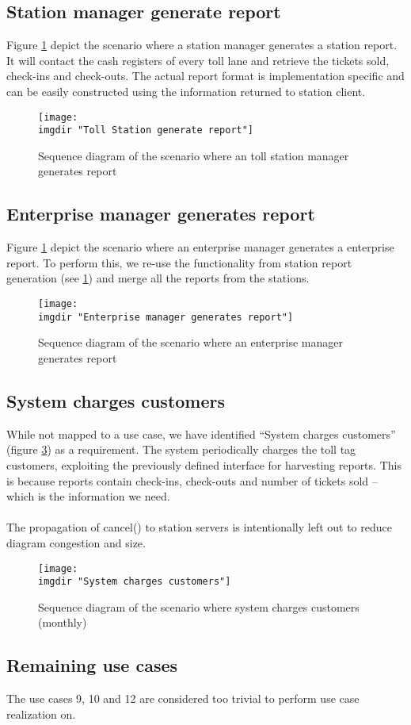 \subsection{Station manager generate report}
Figure \ref{fig:seq_diag:station_manager_generate_report} depict the scenario where a station manager generates a station report. It will contact the cash registers of every toll lane and retrieve the tickets sold, check-ins and check-outs. The actual report format is implementation specific and can be easily constructed using the information returned to station client.
\begin{figure} %
  \texttt{[image: \\imgdir "Toll Station generate report"]}
  \caption{Sequence diagram of the scenario where an toll station manager generates report}
  \label{fig:seq_diag:station_manager_generate_report}
\end{figure}

\subsection{Enterprise manager generates report}
Figure \ref{fig:seq_diag:station_manager_generate_report} depict the scenario where an enterprise manager generates a enterprise report. To perform this, we re-use the functionality from station report generation (see \ref{fig:seq_diag:station_manager_generate_report}) and merge all the reports from the stations.
\begin{figure}%
  \texttt{[image: \\imgdir "Enterprise manager generates report"]}
  \caption{Sequence diagram of the scenario where an enterprise manager generates report}
  \label{fig:seq_diag:enterprise_manager_generate_report}
\end{figure}

\subsection{System charges customers}
While not mapped to a use case, we have identified ``System charges customers'' (figure \ref{fig:seq_diag:system_charges_customers}) as a requirement. The system periodically charges the toll tag customers, exploiting the previously defined interface for harvesting reports. This is because reports contain check-ins, check-outs and number of tickets sold -- which is the information we need.\\\\
The propagation of cancel() to station servers is intentionally left out to reduce diagram congestion and size.
\begin{figure}
  \texttt{[image: \\imgdir "System charges customers"]}
  \caption{Sequence diagram of the scenario where system charges customers (monthly)}
  \label{fig:seq_diag:system_charges_customers}
\end{figure}

\subsection{Remaining use cases}
The use cases 9, 10 and 12 are considered too trivial to perform use case realization on.
